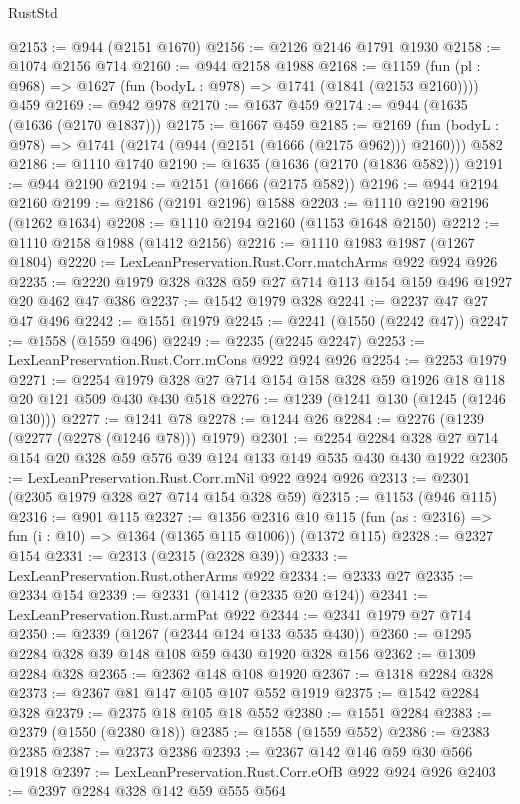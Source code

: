 \begin{lexlean}{RustStd}
\begin{coremodule}
{\begin{coremodule}
{{{{{{{{{{@2153 := @944 (@2151 @1670)
@2156 := @2126 @2146 @1791 @1930
@2158 := @1074 @2156 @714
@2160 := @944 @2158 @1988
@2168 := @1159 (fun (pl : @968) => @1627 (fun (bodyL : @978) => @1741 (@1841 (@2153 @2160)))) @459
@2169 := @942 @978
@2170 := @1637 @459
@2174 := @944 (@1635 (@1636 (@2170 @1837)))
@2175 := @1667 @459
@2185 := @2169 (fun (bodyL : @978) => @1741 (@2174 (@944 (@2151 (@1666 (@2175 @962))) @2160))) @582
@2186 := @1110 @1740
@2190 := @1635 (@1636 (@2170 (@1836 @582)))
@2191 := @944 @2190
@2194 := @2151 (@1666 (@2175 @582))
@2196 := @944 @2194 @2160
@2199 := @2186 (@2191 @2196) @1588
@2203 := @1110 @2190 @2196 (@1262 @1634)
@2208 := @1110 @2194 @2160 (@1153 @1648 @2150)
@2212 := @1110 @2158 @1988 (@1412 @2156)
@2216 := @1110 @1983 @1987 (@1267 @1804)
@2220 := LexLeanPreservation.Rust.Corr.matchArms @922 @924 @926
@2235 := @2220 @1979 @328 @328 @59 @27 @714 @113 @154 @159 @496 @1927 @20 @462 @47 @386
@2237 := @1542 @1979 @328
@2241 := @2237 @47 @27 @47 @496
@2242 := @1551 @1979
@2245 := @2241 (@1550 (@2242 @47))
@2247 := @1558 (@1559 @496)
@2249 := @2235 (@2245 @2247)
@2253 := LexLeanPreservation.Rust.Corr.mCons @922 @924 @926
@2254 := @2253 @1979
@2271 := @2254 @1979 @328 @27 @714 @154 @158 @328 @59 @1926 @18 @118 @20 @121 @509 @430 @430 @518
@2276 := @1239 (@1241 @130 (@1245 (@1246 @130)))
@2277 := @1241 @78
@2278 := @1244 @26
@2284 := @2276 (@1239 (@2277 (@2278 (@1246 @78))) @1979)
@2301 := @2254 @2284 @328 @27 @714 @154 @20 @328 @59 @576 @39 @124 @133 @149 @535 @430 @430 @1922
@2305 := LexLeanPreservation.Rust.Corr.mNil @922 @924 @926
@2313 := @2301 (@2305 @1979 @328 @27 @714 @154 @328 @59)
@2315 := @1153 (@946 @115)
@2316 := @901 @115
@2327 := @1356
    @2316
    @10
    @115
    (fun (as : @2316) => fun (i : @10) => @1364 (@1365 @115 @1006))
    (@1372 @115)
@2328 := @2327 @154
@2331 := @2313 (@2315 (@2328 @39))
@2333 := LexLeanPreservation.Rust.otherArms @922
@2334 := @2333 @27
@2335 := @2334 @154
@2339 := @2331 (@1412 (@2335 @20 @124))
@2341 := LexLeanPreservation.Rust.armPat @922
@2344 := @2341 @1979 @27 @714
@2350 := @2339 (@1267 (@2344 @124 @133 @535 @430))
@2360 := @1295 @2284 @328 @39 @148 @108 @59 @430 @1920 @328 @156
@2362 := @1309 @2284 @328
@2365 := @2362 @148 @108 @1920
@2367 := @1318 @2284 @328
@2373 := @2367 @81 @147 @105 @107 @552 @1919
@2375 := @1542 @2284 @328
@2379 := @2375 @18 @105 @18 @552
@2380 := @1551 @2284
@2383 := @2379 (@1550 (@2380 @18))
@2385 := @1558 (@1559 @552)
@2386 := @2383 @2385
@2387 := @2373 @2386
@2393 := @2367 @142 @146 @59 @30 @566 @1918
@2397 := LexLeanPreservation.Rust.Corr.eOfB @922 @924 @926
@2403 := @2397 @2284 @328 @142 @59 @555 @564
}}}}}}}}}}
\end{coremodule}}
\end{coremodule}
\end{lexlean}
